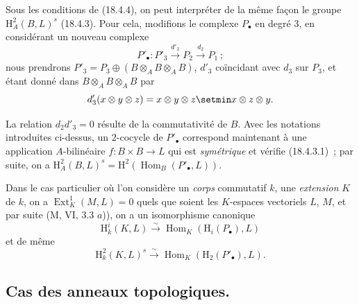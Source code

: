\begin{env}[18.4.5]
\label{0.18.4.5-fr}
Sous les conditions de (18.4.4), on peut interpréter de la même façon le
groupe $\mathrm H_A^2(B,L)^s$ (18.4.3). Pour cela, modifions le complexe
$P_\bullet$ en degré $3$, en considérant un nouveau complexe
\[
  P'_\bullet:P'_3\xrightarrow{d'_3}P_2
  \xrightarrow{d_2}P_1\,;
\]
nous prendrons
$P'_3=P_3\oplus(B\otimes_A B\otimes_A B)$, $d'_3$ coïncidant
avec $d_3$ sur $P_3$, et étant donné dans $B\otimes_A B\otimes_A B$
par
\[
  d'_3(x\otimes y\otimes z)=x\otimes y\otimes z\setmin x\otimes z\otimes y.
\]

La relation $d_2d'_3=0$ résulte de la commutativité de $B$. Avec les notations
introduites ci-dessus, un $2$-cocycle de $P'_\bullet$ correspond
maintenant à une application $A$-bilinéaire $f:B\times B\to L$ qui est
\emph{symétrique} et vérifie (18.4.3.1)~; par suite, on a
$\mathrm H_A^2(B,L)^s=\mathrm H^2(\operatorname{Hom}_B(P'_\bullet,L))$.
\end{env}

\begin{env}[18.4.6]
\label{0.18.4.6-fr}
Dans le cas particulier où l'on considère un \emph{corps} commutatif $k$, une
\emph{extension} $K$ de $k$, on a $\operatorname{Ext}_K^1(M,L)=0$ quels que
soient les $K$-espaces vectoriels $L$, $M$, et par suite (M, VI, 3.3 $a$)), on
a un isomorphisme canonique
\begin{equation}
\label{0.18.4.6.1-fr}
\tag{18.4.6.1}
  \mathrm H_k^i(K,L)\xrightarrow{\sim}
  \operatorname{Hom}_K(\mathrm H_i(P_\bullet),L)
\end{equation}
et de même
\begin{equation}
\label{0.18.4.6.2-fr}
\tag{18.4.6.2}
  \mathrm H_k^2(K,L)^s\xrightarrow{\sim}
  \operatorname{Hom}_K(\mathrm H_2(P'_\bullet),L).
\end{equation}
\end{env}

\subsection{Cas des anneaux topologiques.}
\label{subsection:0.18.5-fr}

